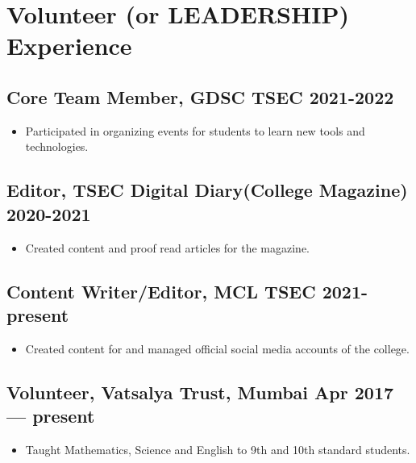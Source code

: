 \documentclass[10pt]{article}
\newenvironment{zitemize}{
\begin{itemize}\itemsep2pt \parskip0pt \parsep1pt}
{\end{itemize}\vspace{-0.5cm}}
\begin{document}
\section{Volunteer (or LEADERSHIP) Experience}

\subsection*{Core Team Member, GDSC TSEC \hfill 2021-2022} 
    \begin{zitemize}
            \item Participated in organizing events for students to learn new tools and technologies.
    \end{zitemize}
\subsection*{Editor, TSEC Digital Diary(College Magazine) \hfill 2020-2021} 
    \begin{zitemize}
            \item Created content and proof read articles for the magazine.
    \end{zitemize}
\subsection*{Content Writer/Editor, MCL TSEC \hfill 2021-present} 
    \begin{zitemize}
            \item Created content for and managed official social media accounts of the college.
    \end{zitemize}
\subsection*{Volunteer, Vatsalya Trust, Mumbai \hfill Apr 2017 --- present} 
    \begin{zitemize}
            \item  Taught Mathematics, Science and English to 9th and 10th standard students.
    \end{zitemize}


\end{document}
